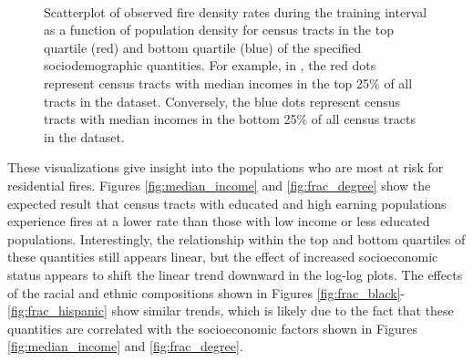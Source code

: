 \documentclass{svjour3}
\begin{document}
\begin{figure}[!ht]
\begin{center}
{          }\\
      \end{center}
      \caption{Scatterplot of observed fire density rates during the training interval as a function of population density for census tracts in the top quartile (red) and bottom quartile (blue) of the specified sociodemographic quantities. For example, in \protect{}, the red dots represent census tracts with median incomes in the top 25\% of all tracts in the dataset. Conversely, the blue dots represent census tracts with median incomes in the bottom 25\% of all census tracts in the dataset.}
     \label{fig:sociodemographic}
  \end{figure}
 
 
 These visualizations give insight into the populations who are most at risk for residential fires. Figures \ref{fig:median_income} and \ref{fig:frac_degree} show the expected result that census tracts with educated and high earning populations experience fires at a lower rate than those with low income or less educated populations. Interestingly, the relationship within the top and bottom quartiles of these quantities still appears linear, but the effect of increased socioeconomic status appears to shift the linear trend downward in the log-log plots. The effects of the racial and ethnic compositions shown in Figures \ref{fig:frac_black}-\ref{fig:frac_hispanic} show similar trends, which is likely due to the fact that these quantities are correlated with the socioeconomic factors shown in Figures \ref{fig:median_income} and \ref{fig:frac_degree}. 
 
\end{document}

